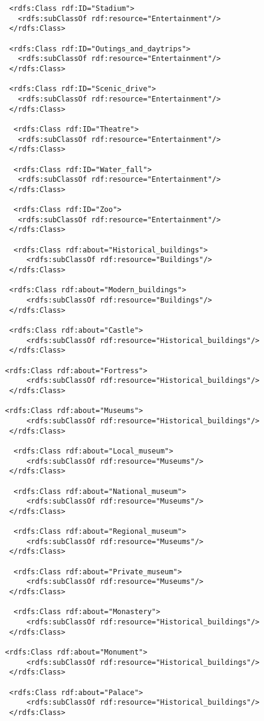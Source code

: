 \begin{verbatim}
  <rdfs:Class rdf:ID="Stadium">
    <rdfs:subClassOf rdf:resource="Entertainment"/>
  </rdfs:Class>
   
  <rdfs:Class rdf:ID="Outings_and_daytrips">
    <rdfs:subClassOf rdf:resource="Entertainment"/>
  </rdfs:Class>
  
  <rdfs:Class rdf:ID="Scenic_drive">
    <rdfs:subClassOf rdf:resource="Entertainment"/>
  </rdfs:Class>
  
   <rdfs:Class rdf:ID="Theatre">
    <rdfs:subClassOf rdf:resource="Entertainment"/>
  </rdfs:Class>
  
   <rdfs:Class rdf:ID="Water_fall">
    <rdfs:subClassOf rdf:resource="Entertainment"/>
  </rdfs:Class>
  
   <rdfs:Class rdf:ID="Zoo">
    <rdfs:subClassOf rdf:resource="Entertainment"/>
  </rdfs:Class>
  
   <rdfs:Class rdf:about="Historical_buildings">
      <rdfs:subClassOf rdf:resource="Buildings"/>
  </rdfs:Class>
  
  <rdfs:Class rdf:about="Modern_buildings">
      <rdfs:subClassOf rdf:resource="Buildings"/>
  </rdfs:Class>
  
  <rdfs:Class rdf:about="Castle">
      <rdfs:subClassOf rdf:resource="Historical_buildings"/>
  </rdfs:Class>
  
 <rdfs:Class rdf:about="Fortress">
      <rdfs:subClassOf rdf:resource="Historical_buildings"/>
  </rdfs:Class> 

 <rdfs:Class rdf:about="Museums">
      <rdfs:subClassOf rdf:resource="Historical_buildings"/>
  </rdfs:Class>  
  
   <rdfs:Class rdf:about="Local_museum">
      <rdfs:subClassOf rdf:resource="Museums"/>
  </rdfs:Class>
  
   <rdfs:Class rdf:about="National_museum">
      <rdfs:subClassOf rdf:resource="Museums"/>
  </rdfs:Class>
  
   <rdfs:Class rdf:about="Regional_museum">
      <rdfs:subClassOf rdf:resource="Museums"/>
  </rdfs:Class>
  
   <rdfs:Class rdf:about="Private_museum">
      <rdfs:subClassOf rdf:resource="Museums"/>
  </rdfs:Class>
  
   <rdfs:Class rdf:about="Monastery">
      <rdfs:subClassOf rdf:resource="Historical_buildings"/>
  </rdfs:Class>
  
 <rdfs:Class rdf:about="Monument">
      <rdfs:subClassOf rdf:resource="Historical_buildings"/>
  </rdfs:Class>
  
  <rdfs:Class rdf:about="Palace">
      <rdfs:subClassOf rdf:resource="Historical_buildings"/>
  </rdfs:Class>
  

\end{verbatim}

